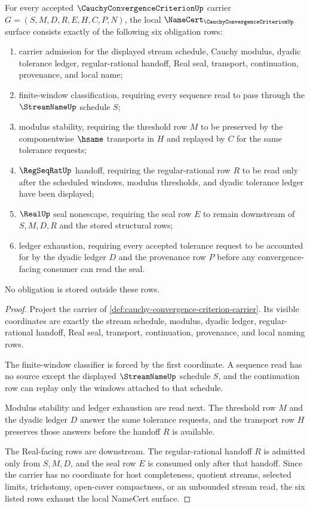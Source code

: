 \begin{theorem}
\label{thm:cauchy-convergence-criterion-namecert-obligations}
For every accepted $\CauchyConvergenceCriterionUp$ carrier $G=(S,M,D,R,E,H,C,P,N)$, the local $\NameCert_{\CauchyConvergenceCriterionUp}$ surface consists exactly of the following six obligation rows:
\begin{enumerate}
\item carrier admission for the displayed stream schedule, Cauchy modulus, dyadic tolerance ledger, regular-rational handoff, Real seal, transport, continuation, provenance, and local name;
\item finite-window classification, requiring every sequence read to pass through the $\StreamNameUp$ schedule $S$;
\item modulus stability, requiring the threshold row $M$ to be preserved by the componentwise $\hsame$ transports in $H$ and replayed by $C$ for the same tolerance requests;
\item $\RegSeqRatUp$ handoff, requiring the regular-rational row $R$ to be read only after the scheduled windows, modulus thresholds, and dyadic tolerance ledger have been displayed;
\item $\RealUp$ seal nonescape, requiring the seal row $E$ to remain downstream of $S,M,D,R$ and the stored structural rows;
\item ledger exhaustion, requiring every accepted tolerance request to be accounted for by the dyadic ledger $D$ and the provenance row $P$ before any convergence-facing consumer can read the seal.
\end{enumerate}
No obligation is stored outside these rows.
\end{theorem}
\begin{proof}
Project the carrier of \autoref{def:cauchy-convergence-criterion-carrier}. Its visible coordinates are exactly the stream schedule, modulus, dyadic ledger, regular-rational handoff, Real seal, transport, continuation, provenance, and local naming rows.

The finite-window classifier is forced by the first coordinate. A sequence read has no source except the displayed $\StreamNameUp$ schedule $S$, and the continuation row can replay only the windows attached to that schedule.

Modulus stability and ledger exhaustion are read next. The threshold row $M$ and the dyadic ledger $D$ answer the same tolerance requests, and the transport row $H$ preserves those answers before the handoff $R$ is available.

The Real-facing rows are downstream. The regular-rational handoff $R$ is admitted only from $S,M,D$, and the seal row $E$ is consumed only after that handoff. Since the carrier has no coordinate for host completeness, quotient streams, selected limits, trichotomy, open-cover compactness, or an unbounded stream read, the six listed rows exhaust the local NameCert surface.
\end{proof}

